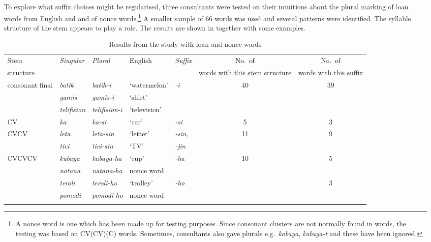 \documentclass[output=paper]{langsci/langscibook}
\begin{document}
To explore what suffix choices might be regularised, three consultants were tested on their intuitions about the plural marking of loan words from English and  and of nonce words.\footnote{A nonce word is one which has been made up for testing purposes. Since consonant clusters are not normally found in  words, the testing was based on CV(CV)(C) words. Sometimes, consultants also gave  plurals e.g.\ \textit{kabaya}, \textit{kabaya-t} and these have been ignored.} A smaller sample of 66 words was used and several patterns were identified. The syllable structure of the stem appears to play a role. The results are shown in  together with some examples.

\begin{table}
\begin{tabularx}{\textwidth}{X>{\itshape}l>{\itshape}lX>{\itshape}lSS}
\lsptoprule

\small {Stem} & \small \textup{Singular} & \small \textup{Plural} & \small {English} & \small \textup{Suffix} & \small {No.\ of}  & \small {No.\ of} \\ [-.15em]
\small {structure} & & & & & \small {words with this stem structure} & \small {words with this suffix} \\ 
\midrule
 consonant final &  batik &  batih-i &  `water\-melon' &  -i &  40 &  39\\
\tablevspace
&  gamis &  gamis-i &  ‘shirt’ &  &  & \\
\tablevspace
&  telifision &  telifision-i &  ‘television’ &  &  & \\
\midrule
 CV &  ka &  ka-si &  ‘car’ &  -si &  5 &  3\\
\midrule
 CVCV &  leta &  leta-sin &  ‘letter’ & { -sin,}
 &  11 &  9\\
\tablevspace
&  tivi &  tivi-sin &  ‘TV’ &   -jin &  & \\
\midrule
 CVCVCV &  kubaya &  kubaya-ha &  ‘cup’ &  -ha &  10 &  5\\
&  natana &  natana-ha &  nonce word &  &  & \\
\tablevspace
&  teroli &  teroli-ho &  ‘trolley’ &  -ho &  &  3\\
\tablevspace
&  pomodi &  pomodi-ho &  nonce word &  &  & \\
\lspbottomrule
\end{tabularx}
\caption{Results from the study with loan and nonce words}
\label{tab:moodie:13}
\end{table}
\end{document}
